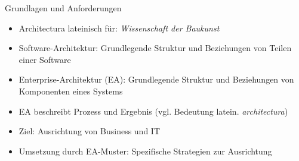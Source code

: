 \begin{frame}{Grundlagen und Anforderungen}
    \begin{itemize}
        \item Architectura lateinisch für: \textit{Wissenschaft der Baukunst}
        \item Software-Architektur: Grundlegende Struktur und Beziehungen von Teilen einer Software \cite{eaprinciples}
        \item Enterprise-Architektur (EA): Grundlegende Struktur und Beziehungen von Komponenten eines Systems
        \item EA beschreibt Prozess und Ergebnis (vgl. Bedeutung latein. \textit{architectura})
        \item Ziel: Ausrichtung von Business und IT
        \item Umsetzung durch EA-Muster: Spezifische Strategien zur Ausrichtung
    \end{itemize}
\end{frame}
